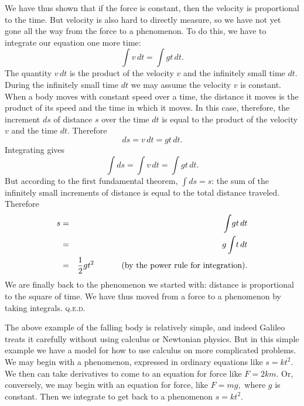 \documentclass[twoside,openright]{article}
\begin{document}
We have thus shown that if the force is constant, then the velocity is
proportional to the time.  But velocity is also hard to directly
measure, so we have not yet gone all the way from the force to a
phenomenon.  To do this, we have to integrate our equation one more
time:
$$\int\!v \,dt = \int\!gt\,dt.$$
The quantity $v\,dt$ is the product of the velocity $v$ and the infinitely small time $dt$.  During the infinitely small time $dt$ we may assume the velocity $v$ is constant.  When a body moves with constant speed over a time, the distance it moves is the product of its speed and the time in which it moves.  In this case, therefore, the increment $ds$ of distance $s$ over the time $dt$ is equal to the product of the velocity $v$ and the time $dt$.  Therefore
$$ds = v\,dt = gt\,dt.$$
Integrating gives
$$\int\!ds = \int\!v\,dt = \int\! gt\,dt.$$
But according to the first fundamental theorem, $\int\!ds = s$: the sum of the infinitely small increments of distance is equal to the total distance traveled.
Therefore
\begin{eqnarray*}
  s & = & \int \!gt\,dt\\
    & = & g\int\!t\,dt\\
    & = & \frac{1}{2}gt^2 \mbox{\hspace{3em} (by the power rule for integration).}
\end{eqnarray*}
We are finally back to the phenomenon we started with: distance is
proportional to the square of time.  We have thus moved from a force
to a phenomenon by taking integrals. \textsc{q.e.d.} \vspace{2ex}

The above example of the falling body is relatively simple, and indeed
Galileo treats it carefully without using calculus or Newtonian
physics.  But in this simple example we have a model for how to use
calculus on more complicated problems.  We may begin with a
phenomenon, expressed in ordinary equations like $s = kt^2$.  We then
can take derivatives to come to an equation for force like $F = 2km$.
Or, conversely, we may begin with an equation for force, like $F= mg,$
where $g$ is constant.  Then we integrate to get back to a phenomenon
$s= kt^2$.\vspace{2ex}
\end{document}
